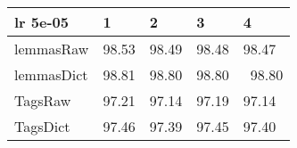 \begin{table}
\centering
\caption{}
\begin{tabular}{l|llll}
\multicolumn{1}{l}{lr 5e-05} & 1     & 2     & 3     & 4       \\ 
\hline\hline
lemmasRaw                    & 98.53 & 98.49 & 98.48 & 98.47   \\ 
\hline
lemmasDict                   & 98.81 & 98.80 & 98.80 & ~98.80  \\ 
\hline
TagsRaw                      & 97.21 & 97.14 & 97.19 & 97.14   \\ 
\hline
TagsDict                     & 97.46 & 97.39 & 97.45 & 97.40   \\
\hline
\end{tabular}
\end{table}




